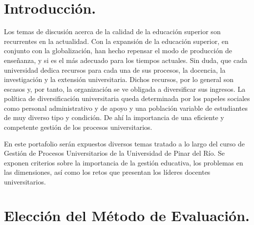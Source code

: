 \documentclass{article}
\begin{document}
\newpage
\section*{\color{uprgreen} Introducción.}
\label{sec:Intro}
{\justifying\fontsize{13}{18}\large

Los temas de discusión acerca de la calidad de la educación superior son recurrentes en la actualidad. Con la expansión de la educación superior, en conjunto con la globalización, han hecho repensar el modo de producción de enseñanza, y si es el más adecuado para los tiempos actuales. Sin duda, que cada universidad dedica recursos para cada una de sus procesos, la docencia, la investigación y la extensión universitaria. Dichos recursos, por lo general son escasos y, por tanto, la organización se ve obligada a diversificar sus ingresos. La política de diversificación universitaria queda determinada por los papeles sociales como personal administrativo y de apoyo y una población variable de estudiantes de muy diverso tipo y condición. De ahí la importancia de una eficiente y competente gestión de los procesos universitarios.

En este portafolio serán expuestos diversos temas tratado a lo largo del curso de Gestión de Procesos Universitarios de la Universidad de Pinar del Río. Se exponen criterios sobre la importancia de la gestión educativa, los problemas en las dimensiones, así como los retos que presentan los líderes docentes universitarios.
}

\section*{\color{uprgreen} Elección del Método de Evaluación.}
\label{sec:EME}
\end{document}
